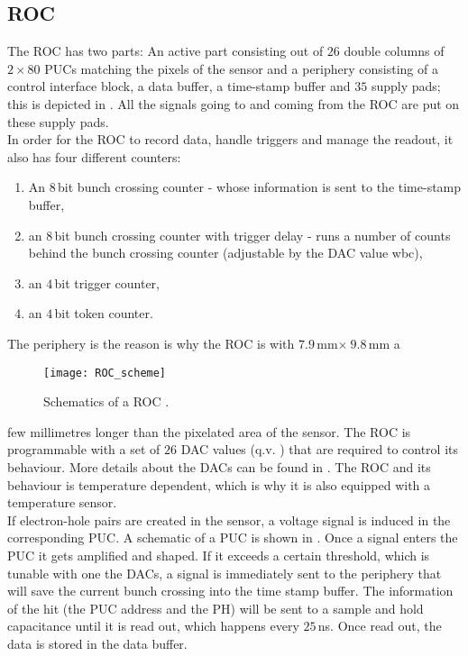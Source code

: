 \documentclass[british,11pt,a4paper]{memoir}
\begin{document}
\subsection{\acs{ROC}}\label{sroc}
The \ac{ROC} has two parts: An active part consisting out of $26$ double columns of $2\times80$ \ac{PUC}s matching the pixels of the sensor and a periphery consisting of a control interface block, a data buffer, a time-stamp buffer and $35$ supply pads; this is depicted in . All the signals going to and coming from the \ac{ROC} are put on these supply pads.\\
In order for the \ac{ROC} to record data, handle triggers and manage the readout, it also has four different counters:
\begin{enumerate}
	\item An $8\,$bit bunch crossing counter - whose information is sent to the time-stamp buffer,
	\item an $8\,$bit bunch crossing counter with trigger delay - runs a number of counts behind the bunch crossing counter (adjustable by the \ac{DAC} value wbc),
	\item an $4\,$bit trigger counter,
	\item an $4\,$bit token counter.
\end{enumerate}\par
The periphery is the reason is why the \ac{ROC} is with $7.9\,$mm$\times\ 9.8\,$mm a
\begin{wrapfigure}{l}{7.3cm}
	\vspace*{-10pt}
	\texttt{[image: ROC\_scheme]}
	\caption{Schematics of a \ac{ROC} \cite{psi46chip}.}
	\label{p8}
	\vspace*{-5pt}
\end{wrapfigure}  
few millimetres longer than the pixelated area of the sensor. The \ac{ROC} is programmable with a set of  $26$ \ac{DAC} values (q.v. ) that are required to control its behaviour. More details about the \ac{DAC}s can be found in . The \ac{ROC} and its behaviour is temperature dependent, which is why it is also equipped with a temperature sensor.\\
If electron-hole pairs are created in the sensor, a voltage signal is induced in the corresponding \ac{PUC}. A schematic of a \ac{PUC} is shown in . Once a signal enters the \ac{PUC} it gets amplified and shaped. If it exceeds a certain threshold, which is tunable with one the \ac{DAC}s, a signal is immediately sent to the periphery that will save the current bunch crossing into the time stamp buffer. The information of the hit (the \ac{PUC} address and the \ac{PH}) will be sent to a sample and hold capacitance until it is read out, which happens every $25\,$ns. Once read out, the data is stored in the data buffer.\\ 
\end{document}
